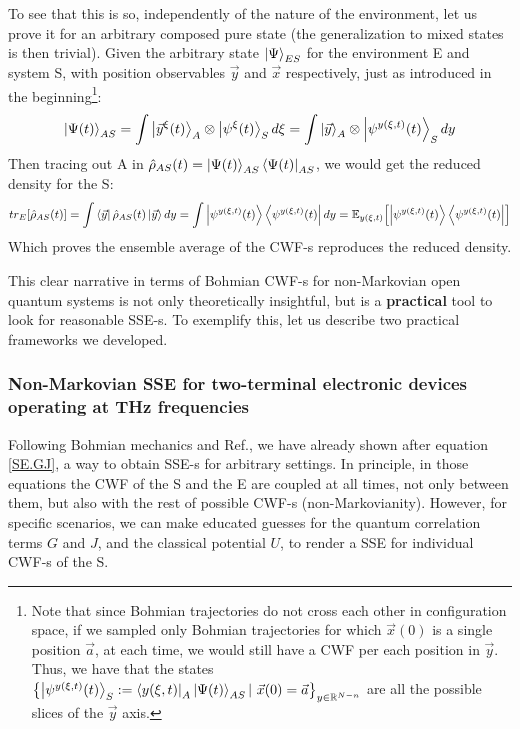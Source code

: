 \documentclass[11pt, a4paper]{article} %
\newcommand{\R}{\mathbb{R}} %
\begin{document}
To see that this is so, independently of the nature of the environment, let us prove it for an arbitrary composed pure state (the generalization to mixed states is then trivial). Given the arbitrary state $\ket{\Psi}_{ES}$ for the environment E and system S, with position observables $\vec{y}$ and $\vec{x}$ respectively, just as introduced in the beginning\footnote{Note that since Bohmian trajectories do not cross each other in configuration space, if we sampled only Bohmian trajectories for which $\vec{x}(0)$ is a single position $\vec{a}$, at each time, we would still have a CWF per each position in $\vec{y}$. Thus, we have that the states $\qty{\ket{\psi^{y(\xi,t)}(t)}_S:=\bra{y(\xi,t)}_A\ket{\Psi(t)}_{AS}|\ \vec{x}(0)=\vec{a}}_{y\in\R^{N-n}}$ are all the possible slices of the $\vec{y}$ axis.}:\vspace{-0.2cm}
\begin{equation}
\ket{\Psi(t)}_{AS}=\int\ket{\vec{y}^\xi(t)}_A\otimes \ket{\psi^\xi(t)}_S d\xi = \int\ket{\vec{y}}_A\otimes \ket{\psi^{y(\xi,t)}(t)}_S dy
\end{equation}
Then tracing out A in $\hat{\rho}_{AS}(t)=\ket{\Psi(t)}_{AS}\bra{\Psi(t)}_{AS}$, we would get the reduced density for the S:
\begin{equation}
tr_E\qty[\hat{\rho}_{AS}(t)] = \int\bra{\vec{y}}\hat{\rho}_{AS}(t)\ket{\vec{y}}dy = \int \ket{\psi^{y(\xi,t)}(t)}\bra{\psi^{y(\xi,t)}(t)} dy = \mathbb{E}_{y(\xi,t)}\qty[\ket{\psi^{y(\xi,t)}(t)}\bra{\psi^{y(\xi,t)}(t)}]
\end{equation}
Which proves the ensemble average of the CWF-s reproduces the reduced density.

This clear narrative in terms of Bohmian CWF-s for non-Markovian open quantum systems is not only theoretically insightful, but is a {\bf practical} tool to look for reasonable SSE-s. To exemplify this, let us describe two practical frameworks we developed.

\subsubsection*{Non-Markovian SSE for two-terminal electronic devices operating at THz frequencies}
Following Bohmian mechanics and Ref.\cite{GJ}, we have already shown after equation \eqref{SE.GJ}, a way to obtain SSE-s for arbitrary settings. In principle, in those equations the CWF of the S and the E are coupled at all times, not only between them, but also with the rest of possible CWF-s (non-Markovianity). However, for specific scenarios, we can make educated guesses for the quantum correlation terms $G$ and $J$, and the classical potential $U$, to render a SSE for individual CWF-s of the S.
\end{document}
